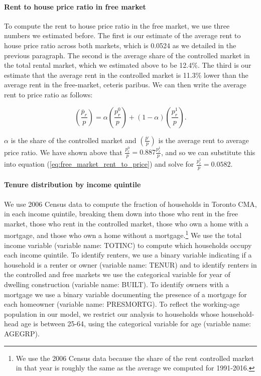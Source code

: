 \documentclass[parskip=full]{article}
\begin{document}
\paragraph{Rent to house price ratio in free market}

To compute the rent to house price ratio in the free market, we use three numbers we estimated before. The first is our estimate of the average rent to house price ratio across both markets, which is 0.0524 as we detailed in the previous paragraph. The second is the average share of the controlled market in the total rental market, which we estimated above to be 12.4\%. The third is our estimate that the average rent in the controlled market is 11.3\% lower than the average rent in the free-market, ceteris paribus. We can then write the average rent to price ratio as follows:

\begin{equation}\label{eq:free_market_rent_to_price}
    {\left(\frac{\overline{p}_{r}}{p}\right)}=\alpha \left(\frac{p^{0}_{r}}{p}\right)+(1-\alpha) \left(\frac{p^{1}_{r}}{p}\right).
\end{equation}

\noindent $\alpha$ is the share of the controlled market and ${\left(\frac{\overline{p}^_{r}}{p}\right)}$ is the average rent to average price ratio. We have shown above that $\frac{p^{0}_{r}}{p}=0.887\frac{p^{1}_{r}}{p}$, and so we can substitute this into equation (\ref{eq:free_market_rent_to_price}) and solve for $\frac{p^{1}_{r}}{p}=0.0582$.

\paragraph{Tenure distribution by income quintile}

We use 2006 Census data to compute the fraction of households in Toronto CMA, in each income quintile, breaking them down into those who rent in the free market, those who rent in the controlled market, those who own a home with a mortgage, and those who own a home without a mortgage.\footnote{We use the 2006 Census data because the share of the rent controlled market in that year is roughly the same as the average we computed for 1991-2016.} We use the total income variable (variable name: TOTINC) to compute which households occupy each income quintile. To identify renters, we use a  binary variable indicating if a household is a renter or owner (variable name: TENUR) and to identify renters in the controlled and free markets we use the categorical variable for year of dwelling construction (variable name: BUILT). To identify owners with a mortgage we use a binary variable documenting the presence of a mortgage for each homeowner (variable name: PRESMORTG). To reflect the working-age population in our model, we restrict our analysis to households whose household-head age is between 25-64, using the categorical variable for age (variable name: AGEGRP). 
\end{document}
